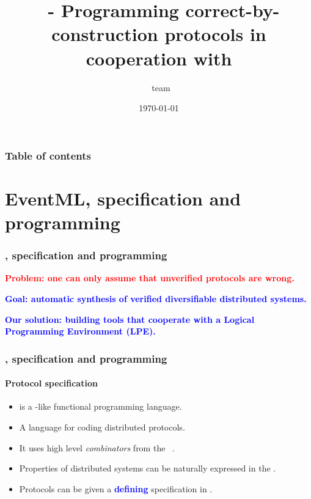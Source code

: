 \documentclass[12pt,red]{beamer}
\title[\eml]{\eml\ - Programming correct-by-construction protocols in
  cooperation with \nuprl}
\author[\prl\ team]{{\small \prl\ team}}
\institute{Cornell University}
\date{\today}
\newcommand{\cemph}[1]{\textcolor{blue}{\textbf{#1}}}
\newcommand{\remph}[1]{\textcolor{red}{\textbf{#1}}}
\begin{document}
\begin{frame}
  \titlepage
\end{frame}


\begin{frame}
  \frametitle{Table of contents}

  \tableofcontents
\end{frame}


\section{EventML, specification and programming}


\begin{frame}
  \frametitle{\eml, specification and programming}

  \remph{Problem: one can only assume that unverified protocols are
    wrong.}

  \vspace{0.2in}

  \cemph{Goal: automatic synthesis of verified diversifiable
    distributed systems.}

  \vspace{0.2in}

  \cemph{Our solution: building tools that cooperate with a Logical
    Programming Environment (LPE).}
\end{frame}


\begin{frame}
  \frametitle{\eml, specification and programming}

  \framesubtitle{Protocol specification}

  \begin{itemize}
  \item \cemph{\eml} is a \ML-like functional programming language.

  \item A language for coding distributed protocols.

  \item It uses high level \emph{combinators} from the
    \cemph{\logicE}~\cite{Bickford:2009,Bickford+Constable:2008}.

  \item Properties of distributed systems can be naturally expressed
    in the \logicE.

  \item Protocols can be given a \cemph{defining} specification in
    \eml.
  \end{itemize}
\end{frame}
\end{document}
